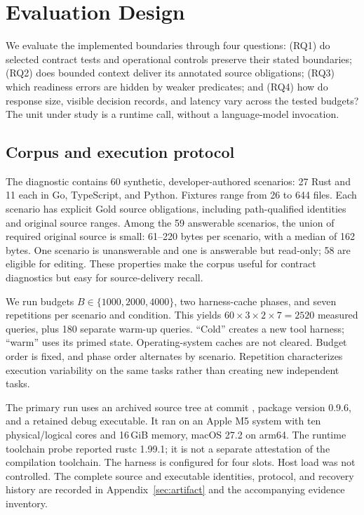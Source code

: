 \section{Evaluation Design}
\label{sec:evaluation}
We evaluate the implemented boundaries through four questions: (RQ1) do selected contract tests and operational controls preserve their stated boundaries; (RQ2) does bounded context deliver its annotated source obligations; (RQ3) which readiness errors are hidden by weaker predicates; and (RQ4) how do response size, visible decision records, and latency vary across the tested budgets? The unit under study is a runtime call, without a language-model invocation.

\subsection{Corpus and execution protocol}
The diagnostic contains 60 synthetic, developer-authored scenarios: 27 Rust and 11 each in Go, TypeScript, and Python. Fixtures range from 26 to 644 files. Each scenario has explicit Gold source obligations, including path-qualified identities and original source ranges. Among the 59 answerable scenarios, the union of required original source is small: 61--220 bytes per scenario, with a median of 162 bytes. One scenario is unanswerable and one is answerable but read-only; 58 are eligible for editing. These properties make the corpus useful for contract diagnostics but easy for source-delivery recall.

We run budgets $B\in\{1000,2000,4000\}$, two harness-cache phases, and seven repetitions per scenario and condition. This yields $60\times3\times2\times7=2520$ measured queries, plus 180 separate warm-up queries. ``Cold'' creates a new tool harness; ``warm'' uses its primed state. Operating-system caches are not cleared. Budget order is fixed, and phase order alternates by scenario. Repetition characterizes execution variability on the same tasks rather than creating new independent tasks.

The primary run uses an archived source tree at commit , package version 0.9.6, and a retained debug executable. It ran on an Apple M5 system with ten physical/logical cores and 16\,GiB memory, macOS 27.2 on arm64. The runtime toolchain probe reported rustc 1.99.1; it is not a separate attestation of the compilation toolchain. The harness is configured for four slots. Host load was not controlled. The complete source and executable identities, protocol, and recovery history are recorded in Appendix~\ref{sec:artifact} and the accompanying evidence inventory.


